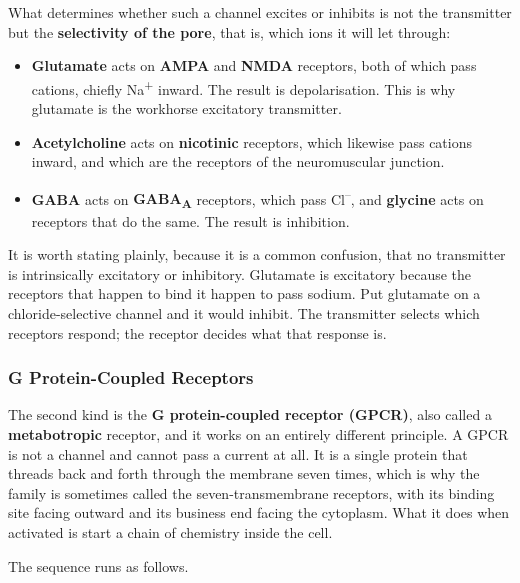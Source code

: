 \documentclass[11pt]{article}
\begin{document}
What determines whether such a channel excites or inhibits is not the transmitter but the \textbf{selectivity of the pore}, that is, which ions it will let through:

\begin{itemize}
    \item \textbf{Glutamate} acts on \textbf{AMPA} and \textbf{NMDA} receptors, both of which pass cations, chiefly Na\textsuperscript{+} inward. The result is depolarisation. This is why glutamate is the workhorse excitatory transmitter.
    \item \textbf{Acetylcholine} acts on \textbf{nicotinic} receptors, which likewise pass cations inward, and which are the receptors of the neuromuscular junction.
    \item \textbf{GABA} acts on \textbf{GABA\textsubscript{A}} receptors, which pass Cl\textsuperscript{--}, and \textbf{glycine} acts on receptors that do the same. The result is inhibition.
\end{itemize}

It is worth stating plainly, because it is a common confusion, that no transmitter is intrinsically excitatory or inhibitory. Glutamate is excitatory because the receptors that happen to bind it happen to pass sodium. Put glutamate on a chloride-selective channel and it would inhibit. The transmitter selects which receptors respond; the receptor decides what that response is.

\subsubsection{G Protein-Coupled Receptors}

The second kind is the \textbf{G protein-coupled receptor (GPCR)}, also called a \textbf{metabotropic} receptor, and it works on an entirely different principle. A GPCR is not a channel and cannot pass a current at all. It is a single protein that threads back and forth through the membrane seven times, which is why the family is sometimes called the seven-transmembrane receptors, with its binding site facing outward and its business end facing the cytoplasm. What it does when activated is start a chain of chemistry inside the cell.

The sequence runs as follows.
\end{document}
